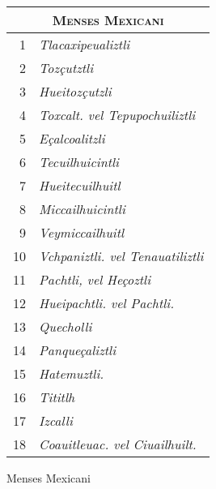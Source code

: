 %
\begin{tabnums} %
\normalsize
\centering
\newcommand{\hts}{\scriptsize}
\newcommand{\cwd}{4em}
%
\newcommand{\da}{\scriptsize{†}}
\begin{tabular}{@{} r l @{}}
\toprule
\multicolumn{2}{c}{\Large\textsc{Menses Mexicani}} \\
\toprule
 1&\textit{Tlacaxipeualiztli} \\
 2&\textit{Tozçutztli} \\
 3&\textit{Hueitozçutzli} \\
 4&\textit{Toxcalt. vel Tepupochuiliztli} \\
 5&\textit{Eçalcoalitzli} \\
 6&\textit{Tecuilhuicintli} \\
 7&\textit{Hueitecuilhuitl} \\
 8&\textit{Miccailhuicintli} \\
 9&\textit{Veymiccailhuitl} \\
10&\textit{Vchpaniztli. vel Tenauatiliztli} \\
11&\textit{Pachtli, vel Heçoztli} \\
12&\textit{Hueipachtli. vel Pachtli.} \\
13&\textit{Quecholli} \\
14&\textit{Panqueçaliztli} \\
15&\textit{Hatemuztli.} \\
16&\textit{Tititlh} \\
17&\textit{Izcalli} \\
18&\textit{Coauitleuac. vel Ciuailhuilt.} \\
\bottomrule
\end{tabular}
%
\caption{Menses Mexicani}
\label{tab:p224a}
%
\end{tabnums}
